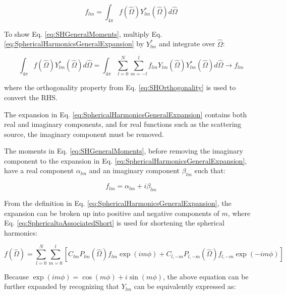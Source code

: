 \documentclass[10pt]{article}
\begin{document}
\begin{flushleft}
\begin{equation}
\label{eq:SHGeneralMoments}
f_{lm}=\int_{4\pi}^{}f(\hat{\Omega})Y_{lm}^{*}(\hat{\Omega})d\hat{\Omega}
\end{equation}

\begin{tcolorbox}[breakable]
To show Eq. \eqref{eq:SHGeneralMoments}, multiply Eq. \eqref{eq:SphericalHarmonicsGeneralExpansion} by \(Y_{lm}^{*}\) and integrate over \(\hat{\Omega}\):

\begin{equation}
\int_{4\pi}^{}f(\hat{\Omega})Y_{lm}^{*}(\hat{\Omega})d\hat{\Omega}=\int_{4\pi}^{}\sum_{l=0}^{N}\sum_{m=-l}^{l}f_{lm}Y_{lm}(\hat{\Omega})Y_{lm}^{*}(\hat{\Omega})d\hat{\Omega}\rightarrow f_{lm}
\end{equation}

where the orthogonality property from Eq. \eqref{eq:SHOrthogonality} is used to convert the RHS.
\end{tcolorbox}

The expansion in Eq. \eqref{eq:SphericalHarmonicsGeneralExpansion} contains both real and imaginary components, and for real functions such as the scattering source, the imaginary component must be removed. 

\begin{tcolorbox}[breakable]
The moments in Eq. \eqref{eq:SHGeneralMoments}, before removing the imaginary component to the expansion in Eq. \eqref{eq:SphericalHarmonicsGeneralExpansion}, have a real component \(\alpha_{lm}\) and an imaginary component \(\beta_{lm}\) such that:

\begin{equation}
\label{eq:GeneralComplexNumber}
f_{lm}=\alpha_{lm}+i\beta_{lm}
\end{equation}

From the definition in Eq. \eqref{eq:SphericalHarmonicsGeneralExpansion}, the expansion can be broken up into positive and negative components of \(m\), where Eq. \eqref{eq:SphericaltoAssociatedShort} is used for shortening the spherical harmonics:

\begin{equation}
\label{eq:BeginningExpansion1}
f(\hat{\Omega})=\sum_{l=0}^{N}\sum_{m=0}^{l}\left\lbrack C_{lm}P_{lm}(\hat{\Omega})f_{lm}\exp{(im\phi)}+C_{l,-m}P_{l,-m}(\hat{\Omega})f_{l,-m}\exp{(-im\phi)}\right\rbrack
\end{equation}

Because \(\exp{(im\phi)}=\cos{(m\phi)}+i\sin{(m\phi)}\), the above equation can be further expanded by recognizing that \(Y_{lm}\) can be equivalently expressed as:


\end{tcolorbox}
\end{flushleft}
\end{document}
